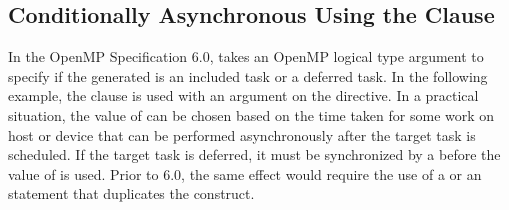 \subsection{Conditionally Asynchronous  Using the  Clause}
\label{subsec:async_target_nowait_arg}

In the OpenMP Specification 6.0,  takes an OpenMP logical type argument to specify if the generated  is an included task or a deferred task. In the following example, the  clause is used with an argument on the  directive. In a practical situation, the value of  can be chosen based on the time taken for some work on host or device that can be performed asynchronously after the target task is scheduled. If the target task is deferred, it must be synchronized by a  before the value of  is used. Prior to 6.0, the same effect would require the use of a  or an  statement that duplicates the  construct.



